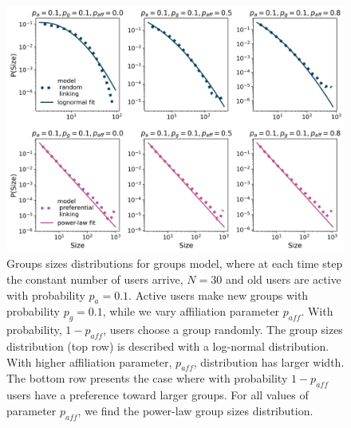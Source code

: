\begin{figure}[h]
	\centering
	\includegraphics[width=0.7\linewidth]{figures/model_N30.png}
	\caption{Groups sizes distributions for groups model, where at each time step the constant number of users arrive, $N=30$ and old users are active with probability $p_a=0.1$. Active users make new groups with probability $p_g=0.1$, while we vary affiliation parameter $p_{aff}$. With probability, $1-p_{aff}$, users choose a group randomly. The group sizes distribution (top row) is described with a log-normal distribution. With higher affiliation parameter, $p_{aff}$, distribution has larger width. The bottom row presents the case where with probability $1-p_{aff}$ users have a preference toward larger groups. For all values of parameter $p_{aff}$, we find the power-law group sizes distribution.}
	\label{fig:model_comp}
\end{figure}





